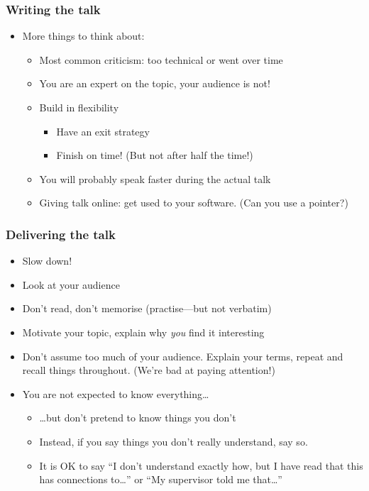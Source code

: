 \documentclass[t]{beamer} %
\begin{document}
\begin{frame}
\frametitle{Writing the talk}
\begin{itemize}
\item More things to think about: 
\begin{itemize}
\item Most common criticism: too technical or went over time  
\item You are an expert on the topic, your audience is not!
\item Build in flexibility
\begin{itemize}
\item Have an exit strategy
\item Finish on time! (But not after half the time!) 
\end{itemize}
\item You will probably speak faster during the actual talk
\item Giving talk online: get used to your software. (Can you use a pointer?)
\end{itemize}
\end{itemize}
\end{frame}

\begin{frame}
\frametitle{Delivering the talk}
\begin{itemize}
\item Slow down! 
\item Look at your audience
\item Don't read, don't memorise (practise---but not verbatim) 
\item Motivate your topic, explain why \emph{you} find it interesting 
\item Don't assume too much of your audience. Explain your terms, repeat and recall things throughout. (We're bad at paying attention!) 
\item You are not expected to know everything\ldots
\begin{itemize}
\item \ldots but don't pretend to know things you don't  
\item Instead, if you say things you don't really understand, say so.
\item It is OK to say ``I don't understand exactly how, but I have read
that this has connections to\ldots'' or ``My supervisor told me that\ldots''
\end{itemize}
\end{itemize}
\end{frame}
\end{document}

